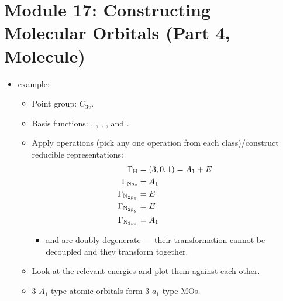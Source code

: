 \documentclass[../notes.tex]{subfiles}
\begin{document}
\section{Module 17: Constructing Molecular Orbitals (Part 4,  Molecule)}
\begin{itemize}
    \item {} example:
    \begin{itemize}
        \item Point group: $C_{3v}$.
        \item Basis functions: , , , , and .
        \item Apply operations (pick any one operation from each class)/construct reducible representations:
        \begin{align*}
            \Gamma_{\ce{H}} &= (3,0,1) = A_1+E\\
            \Gamma_{\ce{N_{$2s$}}} &= A_1\\
            \Gamma_{\ce{N_{$2p_x$}}} &= E\\
            \Gamma_{\ce{N_{$2p_y$}}} &= E\\
            \Gamma_{\ce{N_{$2p_z$}}} &= A_1
        \end{align*}
        \begin{itemize}
            \item {} and  are doubly degenerate --- their transformation cannot be decoupled and they transform together.
        \end{itemize}
        \item Look at the relevant energies and plot them against each other.
        \item 3 $A_1$ type atomic orbitals form 3 $a_1$ type MOs.
        \begin{figure}[H]
            \centering
\end{figure}
\end{itemize}
\end{itemize}
\end{document}
